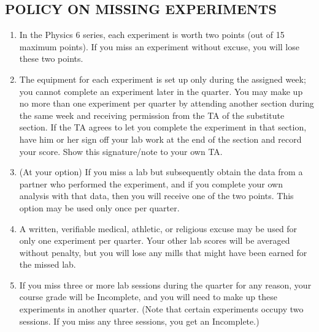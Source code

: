 \subsection*{POLICY ON MISSING EXPERIMENTS}

\begin{enumerate}[label=\arabic*.]

\item In the Physics 6 series, each experiment is worth two points (out of 15 maximum points).  If you miss an experiment without excuse, you will lose these two points.

\item The equipment for each experiment is set up only during the assigned week; you cannot complete an experiment later in the quarter.  You may make up no more than one experiment per quarter by attending another section during the same week and receiving permission from the TA of the substitute section.  If the TA agrees to let you complete the experiment in that section, have him or her sign off your lab work at the end of the section and record your score.  Show this signature/note to your own TA.

\item (At your option) If you miss a lab but subsequently obtain the data from a partner who performed the experiment, and if you complete your own analysis with that data, then you will receive one of the two points.  This option may be used only once per quarter.

\item A written, verifiable medical, athletic, or religious excuse may be used for only one experiment per quarter.  Your other lab scores will be averaged without penalty, but you will lose any mills that might have been earned for the missed lab.

\item If you miss three or more lab sessions during the quarter for any reason, your course grade will be Incomplete, and you will need to make up these experiments in another quarter.  (Note that certain experiments occupy two sessions.  If you miss any three sessions, you get an Incomplete.)

\end{enumerate}
